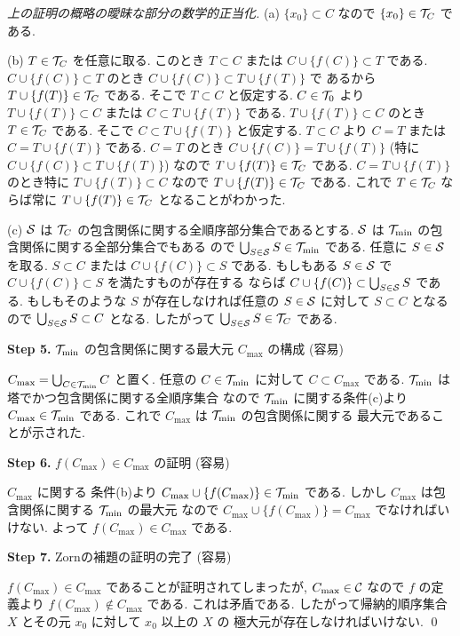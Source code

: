 \documentclass[12pt,twoside]{jarticle}
\begin{document}
\begin{proof}[上の証明の概略の曖昧な部分の数学的正当化]
  (a) $\{x_0\}\subset C$ なので $\{x_0\}\in{\mathcal T}_C$ である.

  (b) $T\in{\mathcal T}_C$ を任意に取る. 
  このとき $T\subset C$ または $C\cup\{f(C)\}\subset T$ である.
  $C\cup\{f(C)\}\subset T$ のとき $C\cup\{f(C)\}\subset T\cup\{f(T)\}$ で
  あるから $T\cup\{f(T)\}\in{\mathcal T}_C$ である.
  そこで $T\subset C$ と仮定する.
  $C\in{\mathcal T}_0$ より $T\cup\{f(T)\}\subset C$ 
  または $C\subset T\cup\{f(T)\}$ である. 
  $T\cup\{f(T)\}\subset C$ のとき $T\in{\mathcal T}_C$ である.
  そこで $C\subset T\cup\{f(T)\}$ と仮定する.
  $T\subset C$ より $C=T$ または $C=T\cup\{f(T)\}$ である.
  $C=T$ のとき $C\cup\{f(C)\}=T\cup\{f(T)\}$ 
  (特に $C\cup\{f(C)\}\subset T\cup\{f(T)\}$)
  なので $T\cup\{f(T)\}\in{\mathcal T}_C$ である.
  $C=T\cup\{f(T)\}$ のとき特に $T\cup\{f(T)\}\subset C$ 
  なので $T\cup\{f(T)\}\in{\mathcal T}_C$ である.
  これで $T\in{\mathcal T}_C$ ならば常に $T\cup\{f(T)\}\in{\mathcal T}_C$ となることがわかった.

  (c) ${\mathcal S}$ は ${\mathcal T}_C$ の包含関係に関する全順序部分集合であるとする.
  ${\mathcal S}$ は ${\mathcal T}_{\min}$ の包含関係に関する全部分集合でもある
  ので $\bigcup_{S\in{\mathcal S}}S\in{\mathcal T}_{\min}$ である.
  任意に $S\in{\mathcal S}$ を取る. $S\subset C$ または $C\cup\{f(C)\}\subset S$ である.
  もしもある $S\in{\mathcal S}$ で $C\cup\{f(C)\}\subset S$ を満たすものが存在する
  ならば $C\cup\{f(C)\}\subset \bigcup_{S\in{\mathcal S}}S$ である.
  もしもそのような $S$ が存在しなければ任意の $S\in{\mathcal S}$ に対して $S\subset C$
  となるので $\bigcup_{S\in{\mathcal S}}S\subset C$ となる.
  したがって $\bigcup_{S\in{\mathcal S}}S\in{\mathcal T}_C$ である.

  \medskip\noindent
  {\bf Step 5.}  ${\mathcal T}_{\min}$ の包含関係に関する最大元 $C_{\max}$ の構成 (容易)
  \medskip

  $C_{\max}=\bigcup_{C\in{\mathcal T}_{\min}}C$ と置く. 
  任意の $C\in{\mathcal T}_{\min}$ に対して $C\subset C_{\max}$ である.
  ${\mathcal T}_{\min}$ は塔でかつ包含関係に関する全順序集合
  なので ${\mathcal T}_{\min}$ に関する条件(c)より $C_{\max}\in{\mathcal T}_{\min}$ である.
  これで $C_{\max}$ は ${\mathcal T}_{\min}$ の包含関係に関する
  最大元であることが示された.

  \medskip\noindent
  {\bf Step 6.} $f(C_{\max})\in C_{\max}$ の証明 (容易)
  \medskip

  $C_{\max}$ に関する
  条件(b)より $C_{\max}\cup\{f(C_{\max})\}\in{\mathcal T}_{\min}$ である.
  しかし $C_{\max}$ は包含関係に関する ${\mathcal T}_{\min}$ の最大元
  なので $C_{\max}\cup\{f(C_{\max})\}=C_{\max}$ でなければいけない. 
  よって $f(C_{\max})\in C_{\max}$ である.

  \medskip\noindent
  {\bf Step 7.} Zornの補題の証明の完了 (容易)
  \medskip
  
  $f(C_{\max})\in C_{\max}$ であることが証明されてしまったが, 
  $C_{\max}\in{\mathcal C}$ なので $f$ の定義より $f(C_{\max})\not\in C_{\max}$ である.
  これは矛盾である. 
  したがって帰納的順序集合 $X$ とその元 $x_0$ に対して $x_0$ 以上の $X$ の
  極大元が存在しなければいけない.
  \qed
\end{proof}
\end{document}
